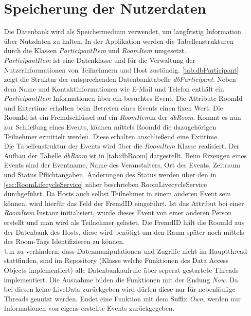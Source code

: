 \section{Speicherung der Nutzerdaten}
\label{sec:Datenbank}
Die Datenbank wird als Speichermedium verwendet, um langfristig Information über Nutzdaten zu halten. 
In der Applikation werden die Tabellenstrukturen durch die Klassen \textit{ParticipantItem} und \textit{RoomItem} umgesetzt. \\
\textit{ParticipantItem} ist eine Datenklasse und für die Verwaltung der Nutzerinformationen von Teilnehmern und Host zuständig.
\cref{tab:dbParticipant} zeigt die Struktur der entsprechenden Datenbanktabelle \textit{dbParticipant}. 
Neben dem Name und Kontaktinformationen wie E-Mail und Telefon enthält ein \textit{ParticipantItem} Informationen über ein besuchtes Event. 
Die Attribute RoomId und Entertime erhalten beim Betreten eines Events einen fixen Wert. 
Die RoomId ist ein Fremdschlüssel auf ein \textit{RoomItem}in der \textit{dbRoom}.
Kommt es nun zur Schließung eines Events, können mittels RoomId die dazugehörigen Teilnehmer ermittelt werden. 
Diese erhalten anschließend eine Exittime.\\
Die Tabellenstruktur der Events wird über die \textit{RoomItem} Klasse realisiert. Der Aufbau der Tabelle \textit{dbRoom} ist in \cref{tab:dbRoom} dargestellt. 
Beim Erzeugen eines Events sind der Eventname, Name des Veranstalters, Ort des Events, Zeitraum und Status Pflichtangaben.
Änderungen des Status werden über den in \cref{sec:RoomLifecycleService} näher beschrieben RoomLivecycleService durchgeführt.
Da Hosts auch selbst Teilnehmer in einem anderen Event sein können, wird hierfür das Feld der FremdID eingeführt.
Ist das Attribut bei einer \textit{RoomItem} Instanz initialisiert, wurde dieses Event von einer anderen Person erstellt und man wird als Teilnehmer gelistet. 
Die FremdID hält die RoomId aus der Datenbank des Hosts, diese wird benötigt um den Raum später noch mittels des Room-Tags Identifizieren zu können.   \\
Um zu verhindern, dass Datenmanipulationen und Zugriffe nicht im Hauptthread stattfinden, sind im Repository (Klasse welche Funktionen des Data Access Objects implementiert) alle Datenbankaufrufe über seperat gestartete Threads implementiert.
Die Ausnahme bilden die Funktionen mit der Endung \textit{Now}. 
Da bei diesen keine LiveData zurückgeben wird dürfen diese nur für nebenläufige Threads genutzt werden. 
Endet eine Funktion mit dem Suffix \textit{Own}, werden nur  Informationen von eigens erstellte Events zurückgegeben.
